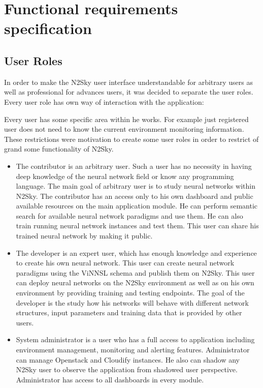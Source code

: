 \section{Functional requirements specification}\label{Functional requirements specification}

\subsection{User Roles}\label{User Roles}

In order to make the N2Sky user interface understandable for arbitrary users as well as professional for advances users, it was decided to separate the user roles. Every user role has own way of interaction with the application:

Every user has some specific area within he works. For example just registered user does not need to know the current environment monitoring information. These restrictions were motivation to create some user roles in order to restrict of grand some functionality of N2Sky.

\begin{itemize}
\item The contributor is an arbitrary user. Such a user has no necessity in having deep knowledge of the neural network field or know any programming language. The main goal of arbitrary user is to study neural networks within N2Sky. The contributor has an access only to his own dashboard and public available resources on the main application module. He can perform semantic search for available neural network paradigms and use them. He can also train running neural network instances and test them. This user can share his trained neural network by making it public. 
\item The developer is an expert user, which has enough knowledge and experience to create his own neural network. This user can create neural network paradigms using the ViNNSL schema and publish them on N2Sky. This user can deploy neural networks on the N2Sky environment as well as on his own environment by providing training and testing endpoints. The goal of the developer is the study how his networks will behave with different network structures, input parameters and training data that is provided by other users.
\item System administrator is a user who has a full access to application including environment management, monitoring and alerting features. Administrator can manage Openstack and Cloudify instances. He also can shadow any N2Sky user to observe the application from shadowed user perspective. Administrator has access to all dashboards in every module.
\end{itemize}


